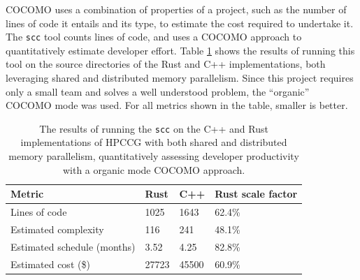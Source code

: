 \acrshort{COCOMO} uses a combination of properties of a project, such as the number of lines of code it entails and its type, to estimate the cost required to undertake it. The \texttt{scc} tool counts lines of code, and uses a \acrshort{COCOMO} approach to quantitatively estimate developer effort. Table \ref{tab:scc-language-comparison} shows the results of running this tool on the source directories of the Rust and C++ implementations, both leveraging shared and distributed memory parallelism. Since this project requires only a small team and solves a well understood problem, the ``organic'' \acrshort{COCOMO} mode was used. For all metrics shown in the table, smaller is better.

\begin{table}[H]
    \centering
    \caption{The results of running the \texttt{scc} on the C++ and Rust implementations of HPCCG with both shared and distributed memory parallelism, quantitatively assessing developer productivity with a organic mode \acrshort{COCOMO} approach.}
    \label{tab:scc-language-comparison}
    \begin{tabular}{|l||l|l|l|}
    \hline
    \textbf{Metric}             & \textbf{Rust} & \textbf{C++} & \textbf{Rust scale factor} \\ \hline\hline
    Lines of code               & 1025          & 1643         & 62.4\%                     \\ \hline
    Estimated complexity        & 116           & 241          & 48.1\%                     \\ \hline
    Estimated schedule (months) & 3.52          & 4.25         & 82.8\%                     \\ \hline
    Estimated cost (\$)         & 27723         & 45500        & 60.9\%                     \\ \hline
    \end{tabular}
\end{table}


